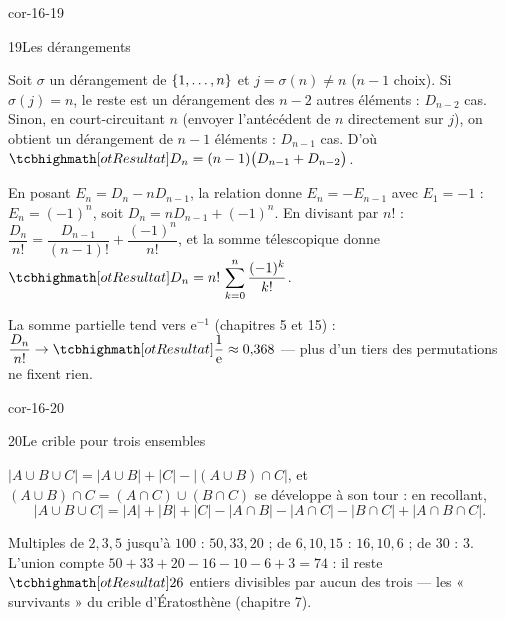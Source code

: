 \begin{blocLivre}{cor-16-19}
\begin{corrige}{19}{Les dérangements}
\begin{questions}
  \item Soit $\sigma$ un dérangement de $\left\{1,\dots,n\right\}$ et
    $j=\sigma(n)\neq n$ ($n-1$ choix). Si $\sigma(j)=n$, le reste est un
    dérangement des $n-2$ autres éléments : $D_{n-2}$ cas. Sinon, en
    court-circuitant $n$ (envoyer l'antécédent de $n$ directement sur
    $j$), on obtient un dérangement de $n-1$ éléments : $D_{n-1}$ cas.
    D'où $\res{D_n=(n-1)\bigl(D_{n-1}+D_{n-2}\bigr)}$.
  \item En posant $E_n=D_n-nD_{n-1}$, la relation donne
    $E_n=-E_{n-1}$ avec $E_1=-1$ : $E_n=(-1)^{n}$, soit
    $D_n=nD_{n-1}+(-1)^{n}$. En divisant par $n!$ :
    $\dfrac{D_n}{n!}=\dfrac{D_{n-1}}{(n-1)!}+\dfrac{(-1)^{n}}{n!}$, et la
    somme télescopique donne
    $\res{D_n=n!\,\displaystyle\sum_{k=0}^{n}\frac{(-1)^{k}}{k!}}$.
  \item La somme partielle tend vers
    $\mathrm{e}^{-1}$ (chapitres 5 et 15) :
    $\dfrac{D_n}{n!}\to\res{\dfrac{1}{\mathrm{e}}}\approx0{,}368$ — plus
    d'un tiers des permutations ne fixent rien.
\end{questions}
\end{corrige}
\end{blocLivre}

\begin{blocLivre}{cor-16-20}
\begin{corrige}{20}{Le crible pour trois ensembles}
\begin{questions}
  \item $|A\cup B\cup C|=|A\cup B|+|C|-|(A\cup B)\cap C|$, et
    $(A\cup B)\cap C=(A\cap C)\cup(B\cap C)$ se développe à son tour :
    en recollant,
    \[
    |A\cup B\cup C|=|A|+|B|+|C|-|A\cap B|-|A\cap C|-|B\cap C|
    +|A\cap B\cap C| .
    \]
  \item Multiples de $2,3,5$ jusqu'à $100$ : $50,33,20$ ; de
    $6,10,15$ : $16,10,6$ ; de $30$ : $3$. L'union compte
    $50+33+20-16-10-6+3=74$ : il reste $\res{26}$ entiers divisibles par
    aucun des trois — les « survivants » du crible d'Ératosthène
    (chapitre 7).
\end{questions}
\end{corrige}
\end{blocLivre}

